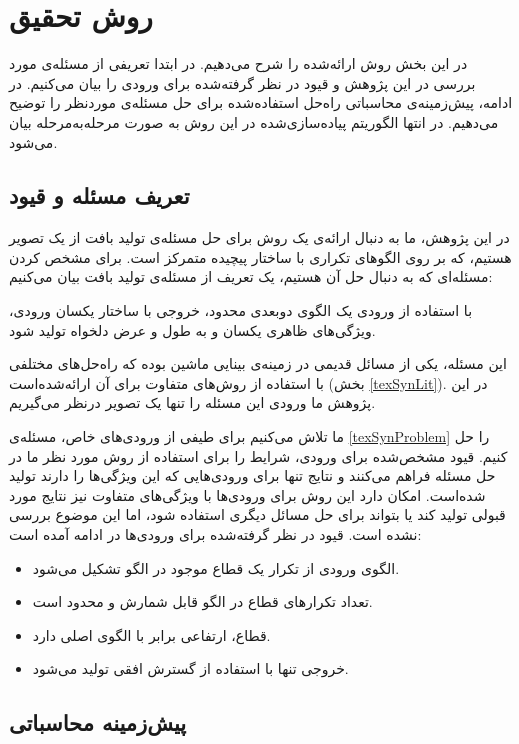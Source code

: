 
\chapter{روش تحقیق}
در این بخش روش ارائه‌شده را شرح می‌دهیم. در ابتدا تعریفی از مسئله‌ی مورد بررسی در این پژوهش و قیود در نظر گرفته‌شده برای ورودی را بیان می‌کنیم. در ادامه، پیش‌زمینه‌ی محاسباتی راه‌حل استفاده‌شده برای حل مسئله‌ی موردنظر را توضیح می‌دهیم. در انتها الگوریتم پیاده‌سازی‌شده در این روش به صورت مرحله‌به‌مرحله بیان می‌شود.
\section{تعریف مسئله و قیود}
\label{section_problem}
در این پژوهش، ما به دنبال ارائه‌ی یک روش برای حل مسئله‌ی تولید بافت از یک تصویر هستیم، که بر روی الگو‌های تکراری با ساختار پیچیده متمرکز است. برای مشخص کردن مسئله‌ای که به دنبال حل آن هستیم، یک تعریف از مسئله‌ی تولید بافت بیان می‌کنیم:
\begin{definition} \label{texSynProblem}
با استفاده از ورودی یک الگوی دو‌بعدی محدود، خروجی با ساختار یکسان ورودی، ویژگی‌های ظاهری یکسان و به طول و عرض دلخواه تولید شود. 
\end{definition}
این مسئله، یکی از مسائل قدیمی در زمینه‌ی بینایی ماشین بوده که راه‌حل‌های مختلفی با استفاده از روش‌های متفاوت برای آن ارائه‌شده‌است (بخش \ref{texSynLit}). در این پژوهش ما ورودی این مسئله را تنها یک تصویر درنظر می‌گیریم.

ما تلاش می‌کنیم برای طیفی از ورودی‌های خاص، مسئله‌ی \ref{texSynProblem} را حل کنیم. قیود مشخص‌شده برای ورودی، شرایط را برای استفاده از روش مورد نظر ما در حل مسئله فراهم می‌کنند و نتایج تنها برای ورودی‌هایی که این ویژگی‌ها را دارند تولید شده‌است. امکان دارد این روش برای ورودی‌ها با ویژگی‌های متفاوت نیز نتایج مورد قبولی تولید کند یا بتواند برای حل مسائل دیگری استفاده شود، اما این موضوع بررسی نشده ‌است. قیود در نظر گرفته‌شده برای ورودی‌ها در ادامه آمده است:
\begin{itemize}
\item 
الگوی ورودی از تکرار یک قطاع موجود در الگو تشکیل می‌شود.
\item 
تعداد تکرار‌های قطاع در الگو قابل شمارش و محدود است.
\item 
قطاع، ارتفاعی برابر با الگوی اصلی دارد.
\item 
خروجی تنها با استفاده از گسترش افقی تولید می‌شود.
\end{itemize}
\section{پیش‌زمینه محاسباتی} \label{conjGradExp}

